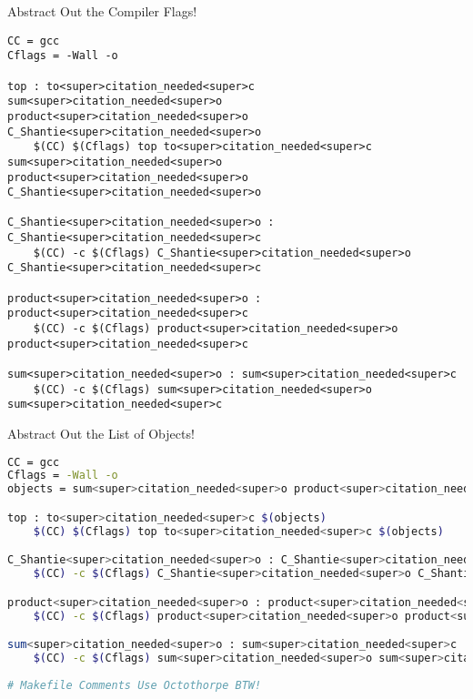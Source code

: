 \documentclass[11pt]{beamer}
\begin{document}
\begin{frame}[fragile=singleslide]{Abstract Out the Compiler Flags!}
\begin{lstlisting}[style=terminal]
CC = gcc
Cflags = -Wall -o 

top : to<super>citation_needed<super>c sum<super>citation_needed<super>o product<super>citation_needed<super>o C_Shantie<super>citation_needed<super>o 
	$(CC) $(Cflags) top to<super>citation_needed<super>c sum<super>citation_needed<super>o product<super>citation_needed<super>o C_Shantie<super>citation_needed<super>o

C_Shantie<super>citation_needed<super>o : C_Shantie<super>citation_needed<super>c
	$(CC) -c $(Cflags) C_Shantie<super>citation_needed<super>o C_Shantie<super>citation_needed<super>c

product<super>citation_needed<super>o : product<super>citation_needed<super>c
	$(CC) -c $(Cflags) product<super>citation_needed<super>o product<super>citation_needed<super>c

sum<super>citation_needed<super>o : sum<super>citation_needed<super>c
	$(CC) -c $(Cflags) sum<super>citation_needed<super>o sum<super>citation_needed<super>c
\end{lstlisting}
\end{frame}

\begin{frame}[fragile=singleslide]{Abstract Out the List of Objects!}
\begin{lstlisting}[style=terminal, language=bash]
CC = gcc
Cflags = -Wall -o 
objects = sum<super>citation_needed<super>o product<super>citation_needed<super>o C_Shantie<super>citation_needed<super>o 

top : to<super>citation_needed<super>c $(objects)
	$(CC) $(Cflags) top to<super>citation_needed<super>c $(objects)

C_Shantie<super>citation_needed<super>o : C_Shantie<super>citation_needed<super>c
	$(CC) -c $(Cflags) C_Shantie<super>citation_needed<super>o C_Shantie<super>citation_needed<super>c

product<super>citation_needed<super>o : product<super>citation_needed<super>c
	$(CC) -c $(Cflags) product<super>citation_needed<super>o product<super>citation_needed<super>c

sum<super>citation_needed<super>o : sum<super>citation_needed<super>c
	$(CC) -c $(Cflags) sum<super>citation_needed<super>o sum<super>citation_needed<super>c
	
# Makefile Comments Use Octothorpe BTW!
\end{lstlisting}
\end{frame}
\end{document}
